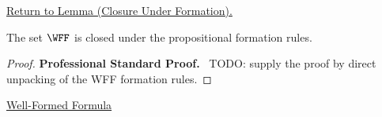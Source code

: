 \newpage
{}
\label{prf:closure-under-formation-propositional-formulas}

\begin{remark*}[Return]
\hyperref[lem:closure-under-formation-propositional-formulas]{Return to Lemma (Closure Under Formation).}
\end{remark*}

\begin{theorem*}
The set \(\WFF\) is closed under the propositional formation rules.
\end{theorem*}

\begin{proof}
\textbf{Professional Standard Proof.}~
TODO: supply the proof by direct unpacking of the WFF formation rules.
\end{proof}

\begin{dependencies}
\hyperref[def:well-formed-formula]{Well-Formed Formula}
\end{dependencies}

\clearpage
